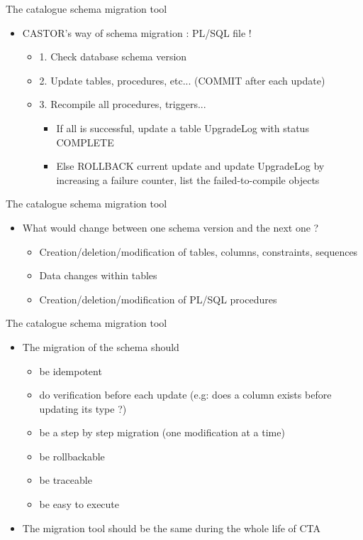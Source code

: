 \documentclass[aspectratio=149]{beamer}
\begin{document}
\begin{frame}{The catalogue schema migration tool}
	\begin{itemize}
		\item CASTOR's way of schema migration : PL/SQL file !
		\begin{itemize}
			\item 1. Check database schema version
			\item 2. Update tables, procedures, etc... (COMMIT after each update)
			\item 3. Recompile all procedures, triggers...
			\begin{itemize} 
				\item If all is successful, update a table UpgradeLog with status COMPLETE
				\item Else ROLLBACK current update and update UpgradeLog by increasing a failure counter, list the failed-to-compile objects
			\end{itemize}
		\end{itemize}
	\end{itemize}
\end{frame}

\begin{frame}{The catalogue schema migration tool}
	\begin{itemize}
		\item What would change between one schema version and the next one ?
		\begin{itemize}
			\item Creation/deletion/modification of tables, columns, constraints, sequences
			\item Data changes within tables
			\item Creation/deletion/modification of PL/SQL procedures
		\end{itemize}
	\end{itemize}
\end{frame}

\begin{frame}{The catalogue schema migration tool}
	\begin{itemize}
		\item The migration of the schema should
		\begin{itemize}
			\item be idempotent
			\item do verification before each update (e.g: does a column exists before updating its type ?)
			\item be a step by step migration (one modification at a time)
			\item be rollbackable
			\item be traceable
			\item be easy to execute
		\end{itemize}
		\item The migration tool should be the same during the whole life of CTA
	\end{itemize}
\end{frame}
\end{document}
